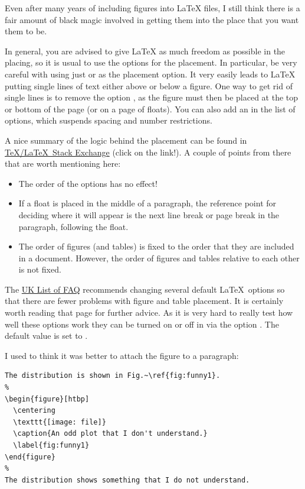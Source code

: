{Even after many years of including figures into \LaTeX{} files, I
still think there is a fair amount of black magic involved in getting
them into the place that you want them to be.

In general, you are advised to give \LaTeX{} as much freedom as
possible in the placing, so it is usual to use the options
\Option{[htbp]} for the placement. In particular, be very careful with
using just \Option{[h]} or \Option{[H]} as the placement option. It very
easily leads to \LaTeX{} putting single lines of text either above or
below a figure.
One way to get rid of single lines is to remove the option ,
as the figure must then be placed at the top or bottom of the page
(or on a page of floats).
You can also add an \Option{!} in the list
of options, which suspends spacing and number restrictions.

A nice summary of the logic behind the placement can be found in
\href{http://tex.stackexchange.com/questions/39017/how-to-influence-the-position-of-float-environments-like-figure-and-table-in-lat}{\TeX/\LaTeX\ Stack Exchange} (click on the link!).
A couple of points from there that are worth mentioning here:
\begin{itemize}
\item The order of the options  has no effect!
\item If a float is placed in the middle of a paragraph,
  the reference point for deciding where it will appear is the next line break or page break in the paragraph,
  following the float.
\item The order of figures (and tables) is fixed to the order that they are included in a document.
  However, the order of figures and tables relative to each other is not fixed.
\end{itemize}

The
\href{http://www.tex.ac.uk/cgi-bin/texfaq2html?label=floats}{UK List of FAQ}
recommends changing several default \LaTeX\ options so that there are fewer problems
with figure and table placement.
It is certainly worth reading that page for further advice.
As it is very hard to really test how well these options work
they can be turned on or off in  via the option .
The default value is set to .

I used to think it was better to attach the figure to a paragraph:
\begin{verbatim}
The distribution is shown in Fig.~\ref{fig:funny1}.
%
\begin{figure}[htbp]
  \centering
  \texttt{[image: file]}
  \caption{An odd plot that I don't understand.}
  \label{fig:funny1}
\end{figure}
%
The distribution shows something that I do not understand.


\end{verbatim}}
